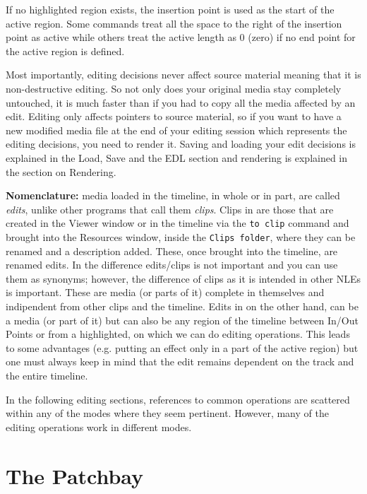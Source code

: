If no highlighted region exists, the insertion point  is used as the
start of the active region.  Some commands treat all the space to
the right of the insertion point as active while others treat the
active length as 0 (zero) if no end point for the active region is
defined.

Most importantly, editing decisions never affect source material
meaning that it is non-destructive editing.  So not only does your
original media stay completely untouched, it is much faster than if
you had to copy all the media affected by an edit.  Editing only
affects pointers to source material, so if you want to have a new
modified media file at the end of your editing session which
represents the editing decisions, you need to render it.  Saving and
loading your edit decisions is explained in the Load, Save and the
EDL  section and rendering is explained in the section on Rendering.

\textbf{Nomenclature:} media loaded in the timeline, in whole or in part, are called \textit{edits}, unlike other programs that call them \textit{clips}. Clips in \CGG{} are those that are created in the Viewer window or in the timeline via the \texttt{to clip} command and brought into the Resources window, inside the \texttt{Clips folder}, where they can be renamed and a description added. These, once brought into the timeline, are renamed edits. In \CGG{} the difference edits/clips is not important and you can use them as synonyms; however, the difference of clips as it is intended in other NLEs is important. These are media (or parts of it) complete in themselves and indipendent from other clips and the timeline. Edits in \CGG{} on the other hand, can be a media (or part of it) but can also be any region of the timeline between In/Out Points or from a highlighted, on which we can do editing operations. This leads to some advantages (e.g. putting an effect only in a part of the active region) but one must always keep in mind that the edit remains dependent on the track and the entire timeline.

In the following editing sections, references to common operations
are scattered within any of the modes where they seem pertinent.
However, many of the editing operations work in different modes.


\section{The Patchbay}%
\label{sec:patchbay}

